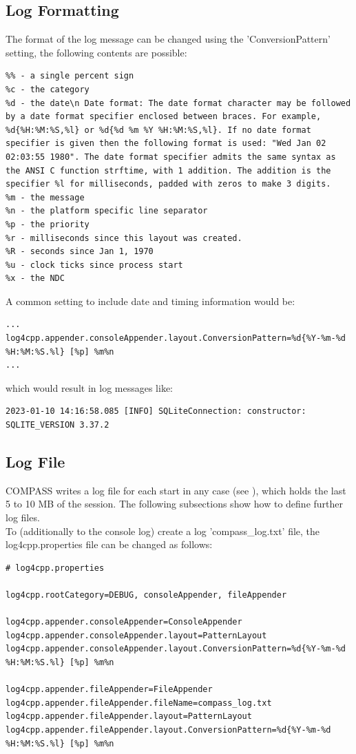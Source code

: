 \subsection{Log Formatting}
The format of the log message can be changed using the 'ConversionPattern' setting, the following contents are possible:
\begin{lstlisting}
%% - a single percent sign
%c - the category
%d - the date\n Date format: The date format character may be followed by a date format specifier enclosed between braces. For example, %d{%H:%M:%S,%l} or %d{%d %m %Y %H:%M:%S,%l}. If no date format specifier is given then the following format is used: "Wed Jan 02 02:03:55 1980". The date format specifier admits the same syntax as the ANSI C function strftime, with 1 addition. The addition is the specifier %l for milliseconds, padded with zeros to make 3 digits.
%m - the message
%n - the platform specific line separator
%p - the priority
%r - milliseconds since this layout was created.
%R - seconds since Jan 1, 1970
%u - clock ticks since process start
%x - the NDC
\end{lstlisting}

A common setting to include date and timing information would be:

\begin{lstlisting}
...
log4cpp.appender.consoleAppender.layout.ConversionPattern=%d{%Y-%m-%d %H:%M:%S.%l} [%p] %m%n
...
\end{lstlisting}

which would result in log messages like:
\begin{lstlisting}
2023-01-10 14:16:58.085 [INFO] SQLiteConnection: constructor: SQLITE_VERSION 3.37.2
\end{lstlisting}


\subsection{Log File}

COMPASS writes a log file for each start in any case (see ), which holds the last 5 to 10 MB of the session. The following subsections show how to define further log files. \\

To (additionally to the console log) create a log 'compass\_log.txt' file, the log4cpp.properties file can be changed as follows:

\begin{lstlisting}
# log4cpp.properties

log4cpp.rootCategory=DEBUG, consoleAppender, fileAppender

log4cpp.appender.consoleAppender=ConsoleAppender
log4cpp.appender.consoleAppender.layout=PatternLayout
log4cpp.appender.consoleAppender.layout.ConversionPattern=%d{%Y-%m-%d %H:%M:%S.%l} [%p] %m%n

log4cpp.appender.fileAppender=FileAppender
log4cpp.appender.fileAppender.fileName=compass_log.txt
log4cpp.appender.fileAppender.layout=PatternLayout
log4cpp.appender.fileAppender.layout.ConversionPattern=%d{%Y-%m-%d %H:%M:%S.%l} [%p] %m%n
\end{lstlisting}

